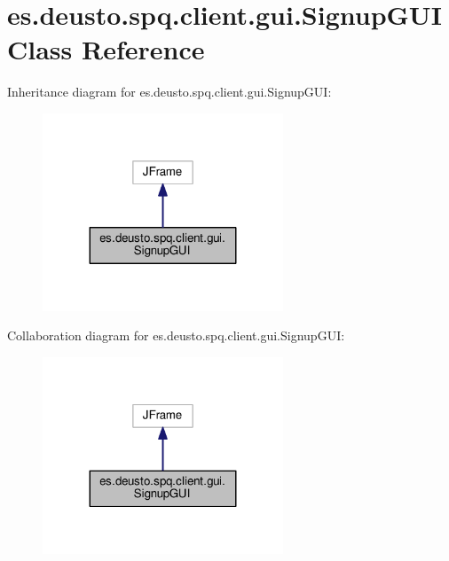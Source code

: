 \hypertarget{classes_1_1deusto_1_1spq_1_1client_1_1gui_1_1_signup_g_u_i}{}\section{es.\+deusto.\+spq.\+client.\+gui.\+Signup\+G\+UI Class Reference}
\label{classes_1_1deusto_1_1spq_1_1client_1_1gui_1_1_signup_g_u_i}


Inheritance diagram for es.\+deusto.\+spq.\+client.\+gui.\+Signup\+G\+UI\+:\nopagebreak
\begin{figure}[H]
\begin{center}
\leavevmode
\includegraphics[width=203pt]{classes_1_1deusto_1_1spq_1_1client_1_1gui_1_1_signup_g_u_i__inherit__graph}
\end{center}
\end{figure}


Collaboration diagram for es.\+deusto.\+spq.\+client.\+gui.\+Signup\+G\+UI\+:\nopagebreak
\begin{figure}[H]
\begin{center}
\leavevmode
\includegraphics[width=203pt]{classes_1_1deusto_1_1spq_1_1client_1_1gui_1_1_signup_g_u_i__coll__graph}
\end{center}
\end{figure}
